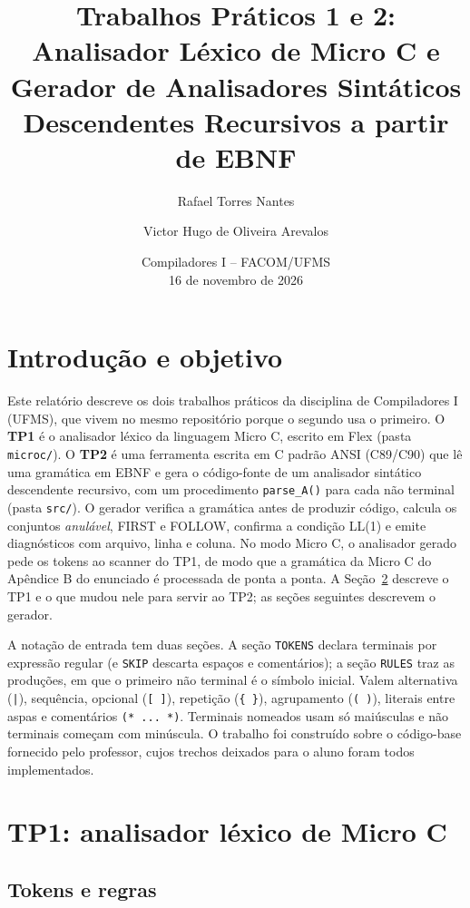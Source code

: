 \documentclass[11pt,a4paper]{article}
\title{Trabalhos Práticos 1 e 2: Analisador Léxico de Micro C e\\Gerador de Analisadores Sintáticos Descendentes Recursivos a partir de EBNF}
\author{Rafael Torres Nantes \and Victor Hugo de Oliveira Arevalos}
\date{Compiladores I -- FACOM/UFMS \\ 16 de novembro de 2026}
\begin{document}
\maketitle

\section{Introdução e objetivo}

Este relatório descreve os dois trabalhos práticos da disciplina de Compiladores I (UFMS), que
vivem no mesmo repositório porque o segundo usa o primeiro. O \textbf{TP1} é o analisador léxico
da linguagem Micro C, escrito em Flex (pasta \texttt{microc/}). O \textbf{TP2} é uma ferramenta
escrita em C padrão ANSI (C89/C90) que lê uma gramática em EBNF e gera o código-fonte de um
analisador sintático descendente recursivo, com um procedimento \texttt{parse\_A()} para cada não
terminal (pasta \texttt{src/}). O gerador verifica a gramática antes de produzir código, calcula
os conjuntos \emph{anulável}, FIRST e FOLLOW, confirma a condição LL(1) e emite diagnósticos com
arquivo, linha e coluna. No modo Micro C, o analisador gerado pede os tokens ao scanner do TP1,
de modo que a gramática da Micro C do Apêndice B do enunciado é processada de ponta a ponta. A
Seção~\ref{sec:tp1} descreve o TP1 e o que mudou nele para servir ao TP2; as seções seguintes
descrevem o gerador.

A notação de entrada tem duas seções. A seção \texttt{TOKENS} declara terminais por expressão
regular (e \texttt{SKIP} descarta espaços e comentários); a seção \texttt{RULES} traz as
produções, em que o primeiro não terminal é o símbolo inicial. Valem alternativa (\texttt{|}),
sequência, opcional (\texttt{[ ]}), repetição (\texttt{\{ \}}), agrupamento (\texttt{( )}),
literais entre aspas e comentários \texttt{(* ... *)}. Terminais nomeados usam só maiúsculas e
não terminais começam com minúscula. O trabalho foi construído sobre o código-base fornecido
pelo professor, cujos trechos deixados para o aluno foram todos implementados.

\section{TP1: analisador léxico de Micro C}
\label{sec:tp1}

\subsection{Tokens e regras}
\end{document}
